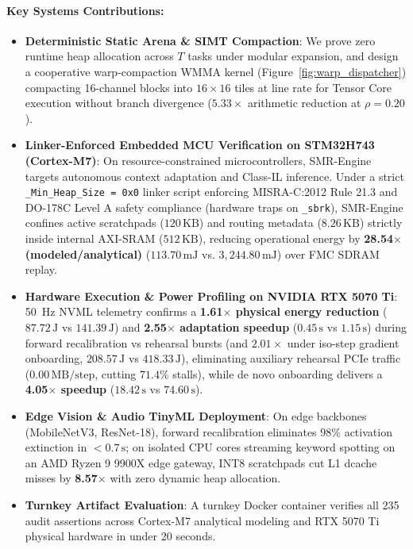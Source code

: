 \documentclass{article}
\begin{document}
\paragraph{Key Systems Contributions:}
\begin{itemize}\itemsep -1.0pt \parsep 0pt
    \item \textbf{Deterministic Static Arena \& SIMT Compaction}: We prove zero runtime heap allocation across $T$ tasks under modular expansion, and design a cooperative warp-compaction WMMA kernel (Figure~\ref{fig:warp_dispatcher}) compacting 16-channel blocks into $16\times 16$ tiles at line rate for Tensor Core execution without branch divergence ($5.33\times$ arithmetic reduction at $\rho=0.20$).
    \item \textbf{Linker-Enforced Embedded MCU Verification on STM32H743 (Cortex-M7)}: On resource-constrained microcontrollers, SMR-Engine targets autonomous context adaptation and Class-IL inference. Under a strict \texttt{\_Min\_Heap\_Size = 0x0} linker script enforcing MISRA-C:2012 Rule 21.3 and DO-178C Level A safety compliance (hardware traps on \texttt{\_sbrk}), SMR-Engine confines active scratchpads ($120\,\text{KB}$) and routing metadata ($8.26\,\text{KB}$) strictly inside internal AXI-SRAM ($512\,\text{KB}$), reducing operational energy by \textbf{28.54$\times$ (modeled/analytical)} ($113.70\,\text{mJ}$ vs. $3{,}244.80\,\text{mJ}$) over FMC SDRAM replay.
    \item \textbf{Hardware Execution \& Power Profiling on NVIDIA RTX 5070 Ti}: 50~Hz NVML telemetry confirms a \textbf{1.61$\times$ physical energy reduction} ($87.72\,\text{J}$ vs $141.39\,\text{J}$) and \textbf{2.55$\times$ adaptation speedup} ($0.45\,\text{s}$ vs $1.15\,\text{s}$) during forward recalibration vs rehearsal bursts (and $\mathbf{2.01\times}$ under iso-step gradient onboarding, $208.57\,\text{J}$ vs $418.33\,\text{J}$), eliminating auxiliary rehearsal PCIe traffic ($0.00\,\text{MB/step}$, cutting $71.4\%$ stalls), while de novo onboarding delivers a \textbf{4.05$\times$ speedup} ($18.42\,\text{s}$ vs $74.60\,\text{s}$).
    \item \textbf{Edge Vision \& Audio TinyML Deployment}: On edge backbones (MobileNetV3, ResNet-18), forward recalibration eliminates $98\%$ activation extinction in $<0.7\,\text{s}$; on isolated CPU cores streaming keyword spotting on an AMD Ryzen 9 9900X edge gateway, INT8 scratchpads cut L1 dcache misses by \textbf{8.57$\times$} with zero dynamic heap allocation.
    \item \textbf{Turnkey Artifact Evaluation}: A turnkey Docker container verifies all 235 audit assertions across Cortex-M7 analytical modeling and RTX 5070 Ti physical hardware in under 20 seconds.
\end{itemize}
\end{document}
